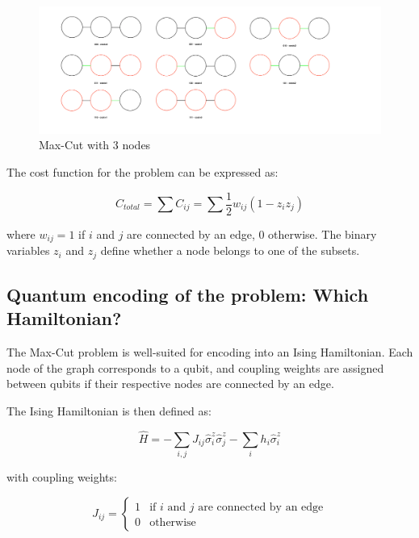 \documentclass{article}
\begin{document}
\begin{multicols}{2}
\begin{figure}[H]
    \centering
    \includegraphics[width = \columnwidth]{fig/02_3_nodes_cuts.png}
    \caption{Max-Cut with 3 nodes}
    \label{fig:Max_cut_edge_3}
\end{figure}

The cost function for the problem can be expressed as:

\begin{equation}
    C_{total} = \sum C_{ij} = \sum \frac{1}{2} w_{ij} (1 - z_i z_j)
\end{equation}

where \( w_{ij} = 1 \) if \( i \) and \( j \) are connected by an edge, \( 0 \) otherwise. The binary variables \( z_i \) and \( z_j \) define whether a node belongs to one of the subsets.

\subsection{Quantum encoding of the problem: Which Hamiltonian?}

The Max-Cut problem is well-suited for encoding into an Ising Hamiltonian. Each node of the graph corresponds to a qubit, and coupling weights are assigned between qubits if their respective nodes are connected by an edge.

The Ising Hamiltonian is then defined as:

\begin{equation}
    \hat{H} = -\sum_{i,j} J_{ij}\hat{\sigma}_i^z\hat{\sigma}_j^z - \sum_i h_i\hat{\sigma}_i^z
\end{equation}

with coupling weights:

\begin{equation}
    J_{ij} = \begin{cases} 
    1 & \text{if } i \text{ and } j \text{ are connected by an edge} \\
    0 & \text{otherwise}
    \end{cases}
\end{equation}


\end{multicols}
\end{document}
